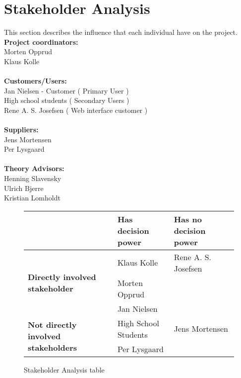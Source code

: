 
\section{Stakeholder Analysis}
This section describes the influence that each individual have on the project.\\[0.2cm]
\textbf{Project coordinators:}\\ Morten Opprud\\ Klaus Kolle\\
\\
\textbf{Customers/Users:}\\
Jan Nielsen - Customer ( Primary User )\\
High school students ( Secondary Users )\\
Rene A. S. Josefsen ( Web interface customer )\\
\\
\textbf{Suppliers:}\\
Jens Mortensen\\
Per Lysgaard\\
\\
\textbf{Theory Advisors:}\\
Henning Slavensky\\
Ulrich Bjerre\\
Kristian Lomholdt\\

\begin{figure}[h!]
 \begin{center}
  \begin{tabular}{| l | l | l |}
   \hline
    & \textbf{Has decision power} & \textbf{Has no decision power} \\ \hline
    \multirow{3}{*}{\textbf{Directly involved stakeholder}} 
    	& Klaus Kolle & Rene A. S. Josefsen\\ 
    	& Morten Opprud &  \\ 
    	& Jan Nielsen &  \\ \hline
    \multirow{2}{*}{\textbf{Not directly involved stakeholders}} 
    	& High School Students & Jens Mortensen\\
    	& Per Lysgaard & \\ \hline
   \end{tabular}
  \end{center}
 \caption{Stakeholder Analysis table}
\end{figure}

